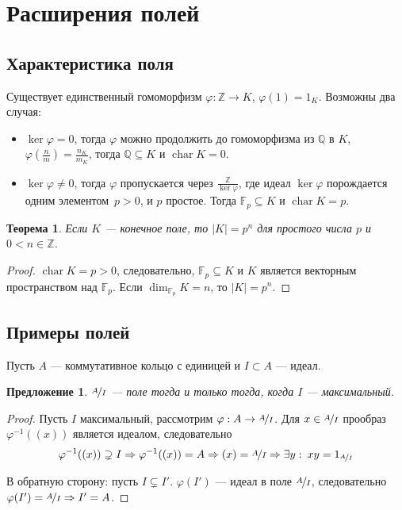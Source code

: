 \documentclass[a4paper]{article}
\newcommand{\Q}{\ensuremath{\mathbb{Q}}}
\newcommand{\Z}{\ensuremath{\mathbb{Z}}}
\newcommand{\F}{\ensuremath{\mathbb{F}}}
\let\temp\phi
\let\phi\varphi
\let\varphi\temp
\DeclareMathOperator{\chr}{char}
\newtheorem{theorem}{Теорема}
\numberwithin{theorem}{section}
\numberwithin{lemma}{section}
\newtheorem{proposition}{Предложение}
\numberwithin{proposition}{section}
\numberwithin{corollary}{section}
\begin{document}
\section{Расширения полей}

\subsection*{Характеристика поля}
Существует единственный гомоморфизм $\phi: \Z \to K$, $\phi(1) = 1_K$.
Возможны два случая:
\begin{itemize}
    \item $\ker \phi = 0$, тогда $\phi$ можно продолжить до гомоморфизма из $\Q$ в $K$,
    $\phi(\frac{n}{m}) = \frac{n_K}{m_K}$,
    тогда $\Q \subseteq K$ и $\chr K = 0$.
    \item
    \begin{minipage}{0.9\linewidth}
        $\ker \phi \ne 0$, тогда $\phi$ пропускается через $\frac{\Z}{\ker \phi}$, где идеал $\ker \phi$ порождается одним элементом~$p > 0$, и $p$ простое.
        Тогда $\F_p \subseteq K$ и $\chr K = p$.
    \end{minipage}
    \begin{minipage}{0.15\linewidth}
    \end{minipage}
\end{itemize}

\begin{theorem}
Если $K$ --- конечное поле, то $|K| = p^n$ для простого числа $p$ и $0 < n \in \Z$.
\end{theorem}
\begin{proof}
$\chr K = p > 0$, следовательно, $\F_p \subseteq K$ и $K$ является векторным пространством над $\F_p$. Если $\dim_{\F_p}K = n$, то $|K| = p^n$.
\end{proof}

\subsection*{Примеры полей}

Пусть $A$ --- коммутативное кольцо с единицей и $I \subset A$ --- идеал.
\begin{proposition}
$\nicefrac{A}{I}$ --- поле тогда и только тогда, когда $I$ --- максимальный.
\end{proposition}
\begin{proof}
Пусть $I$ максимальный, рассмотрим $\phi: A \to \nicefrac{A}{I}$.
Для $x \in \nicefrac{A}{I}$ прообраз $\phi^{-1}((x))$ является идеалом, следовательно
\[\phi^{-1}((x)) \supsetneq I
\Rightarrow \phi^{-1}((x)) = A
\Rightarrow (x) = \nicefrac{A}{I}
\Rightarrow \exists y : \: xy = 1_{\nicefrac{A}{I}}\]

В обратную сторону: пусть $I \subsetneq I'$. $\phi(I')$ --- идеал в
поле $\nicefrac{A}{I}$, следовательно $\phi(I') = \nicefrac{A}{I} \Rightarrow I' = A$.
\end{proof}
\end{document}
